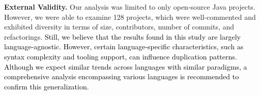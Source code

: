 \textbf{External Validity.} Our analysis was limited to only open-source Java projects. However, we were able to examine 128 projects, which were well-commented and exhibited diversity in terms of size, contributors, number of commits, and refactorings. \textcolor{black}{Still, we believe that the results found in this study are largely language-agnostic. However, certain language-specific characteristics, such as syntax complexity and tooling support, can influence duplication patterns. Although we expect similar trends across languages with similar paradigms, a comprehensive analysis encompassing various languages is recommended to confirm this generalization.}

